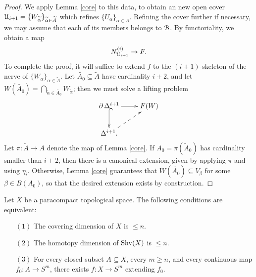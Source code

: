 \begin{proof}
We apply Lemma \ref{core} to this data, to
obtain an new open cover $\operatorname{\mathcal{U}}_{i+1} = \{ W_{\widetilde{\alpha}} \}_{\widetilde{\alpha} \in
\widetilde{A} }$ which refines $\{ U_{\alpha} \}_{\alpha \in A}$.
Refining the cover further if necessary, we may assume that each
of its members belongs to $\operatorname{\mathcal{B}}$. By functoriality, we obtain a
map
$$ N^{(i)}_{\operatorname{\mathcal{U}}_{i+1} } \rightarrow F.$$
To complete the proof,
it will suffice to extend $f$ to the $(i+1)$-skeleton of the nerve
of $\{ W_{\alpha} \}_{\alpha \in \widetilde{A}}$. Let $\widetilde{A_0} \subseteq \widetilde{A}$
have cardinality $i+2$, and let $W( \widetilde{A_0}) = \bigcap_{\widetilde{\alpha} \in \widetilde{A_0}} W_{\widetilde{\alpha}}$; then we must solve a lifting problem
$$ \xymatrix{ \bd \Delta^{i+1} \ar@{^{(}->}[d] \ar[r] & F(W) \\
\Delta^{i+1}. \ar@{-->}[ur] & } $$
Let $\pi: \widetilde{A} \rightarrow A$ denote the map of Lemma \ref{core}.
If $A_0 = \pi( \widetilde{A}_0 )$ has cardinality smaller than $i+2$, then there is a canonical extension, given by applying $\pi$ and using $\eta_{i}$. Otherwise, Lemma \ref{core} guarantees that $W( \widetilde{A_0} ) \subseteq V_{\beta}$ for some $\beta \in B(A_0)$, so that the
desired extension exists by construction.
\end{proof}

\begin{corollary}\label{corub}
Let $X$ be a paracompact topological space. The following conditions are equivalent:
\begin{itemize}
\item[$(1)$] The covering dimension of $X$ is $\leq n$.
\item[$(2)$] The homotopy dimension of $\operatorname{Shv}(X)$ is $\leq n$.
\item[$(3)$] For every closed subset $A \subseteq X$, every $m \geq n$, and every
continuous map $f_0: A \rightarrow S^m$, there exists $f: X \rightarrow S^m$ extending
$f_0$.
\end{itemize}
\end{corollary}


